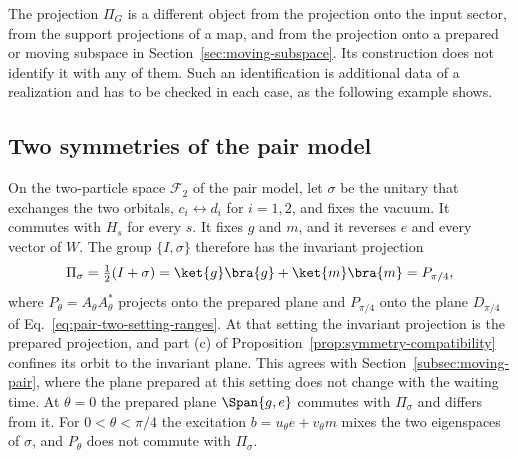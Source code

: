 The projection $\Pi_G$ is a different object from the projection onto the input sector, from the support projections of a map, and from the projection onto a prepared or moving subspace in Section~\ref{sec:moving-subspace}. Its construction does not identify it with any of them. Such an identification is additional data of a realization and has to be checked in each case, as the following example shows.

\subsection{Two symmetries of the pair model}
\label{subsec:symmetry-pair}

On the two-particle space $\mathcal F_2$ of the pair model, let $\sigma$ be the unitary that exchanges the two orbitals, $c_i\leftrightarrow d_i$ for $i=1,2$, and fixes the vacuum. It commutes with $H_s$ for every $s$. It fixes $g$ and $m$, and it reverses $e$ and every vector of $W$. The group $\{I,\sigma\}$ therefore has the invariant projection
\begin{equation}
 \Pi_\sigma=\tfrac12(I+\sigma)=\ket{g}\bra{g}+\ket{m}\bra{m}=P_{\pi/4},
 \label{eq:symmetry-pair-exchange}
\end{equation}
where $P_\theta=A_\theta A_\theta^*$ projects onto the prepared plane and $P_{\pi/4}$ onto the plane $D_{\pi/4}$ of Eq.~\eqref{eq:pair-two-setting-ranges}. At that setting the invariant projection is the prepared projection, and part (c) of Proposition~\ref{prop:symmetry-compatibility} confines its orbit to the invariant plane. This agrees with Section~\ref{subsec:moving-pair}, where the plane prepared at this setting does not change with the waiting time. At $\theta=0$ the prepared plane $\Span\{g,e\}$ commutes with $\Pi_\sigma$ and differs from it. For $0<\theta<\pi/4$ the excitation $b=u_\theta e+v_\theta m$ mixes the two eigenspaces of $\sigma$, and $P_\theta$ does not commute with $\Pi_\sigma$.

